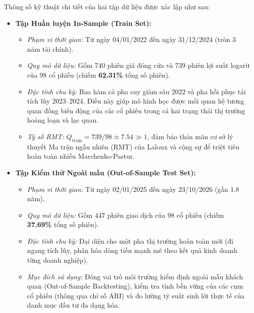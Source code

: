 \documentclass[12pt,a4paper,oneside,openany]{report}
\begin{document}
Thông số kỹ thuật chi tiết của hai tập dữ liệu được xác lập như sau:
\begin{itemize}
  \item \textbf{Tập Huấn luyện In-Sample (Train Set):}
  \begin{itemize}
    \item \textit{Phạm vi thời gian:} Từ ngày 04/01/2022 đến ngày 31/12/2024 (tròn 3 năm tài chính).
    \item \textit{Quy mô dữ liệu:} Gồm $740$ phiên giá đóng cửa và $739$ phiên lợi suất logarit của $98$ cổ phiếu (chiếm \textbf{62.31\%} tổng số phiên).
    \item \textit{Đặc tính chu kỳ:} Bao hàm cả pha suy giảm sâu 2022 và pha hồi phục tái tích lũy 2023--2024. Điều này giúp mô hình học được mối quan hệ tương quan đồng biến động của các cổ phiếu trong cả hai trạng thái thị trường hoảng loạn và lạc quan.
    \item \textit{Tỷ số RMT:} $Q_{\text{train}} = 739 / 98 \approx 7.54 \gg 1$, đảm bảo thỏa mãn cơ sở lý thuyết Ma trận ngẫu nhiên (RMT) của Laloux và cộng sự \cite{laloux1999} để triệt tiêu hoàn toàn nhiễu Marchenko-Pastur.
  \end{itemize}
  \item \textbf{Tập Kiểm thử Ngoài mẫu (Out-of-Sample Test Set):}
  \begin{itemize}
    \item \textit{Phạm vi thời gian:} Từ ngày 02/01/2025 đến ngày 23/10/2026 (gần 1.8 năm).
    \item \textit{Quy mô dữ liệu:} Gồm $447$ phiên giao dịch của $98$ cổ phiếu (chiếm \textbf{37.69\%} tổng số phiên).
    \item \textit{Đặc tính chu kỳ:} Đại diện cho một pha thị trường hoàn toàn mới (đi ngang tích lũy, phân hóa dòng tiền mạnh mẽ theo kết quả kinh doanh từng doanh nghiệp).
    \item \textit{Mục đích sử dụng:} Đóng vai trò môi trường kiểm định ngoài mẫu khách quan (Out-of-Sample Backtesting), kiểm tra tính bền vững của các cụm cổ phiếu (thông qua chỉ số ARI) và đo lường tỷ suất sinh lời thực tế của danh mục đầu tư đa dạng hóa.
  \end{itemize}
\end{itemize}
\end{document}
